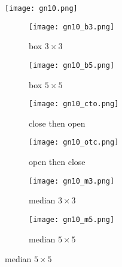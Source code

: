 \documentclass{article}
\begin{document}
\begin{figure}[ht]
    \centering
    \texttt{[image: gn10.png]}
    \caption{gaussian noise 10}
    \label{fig:top_image}

    \begin{subfigure}{0.3\textwidth}
        \texttt{[image: gn10\_b3.png]}
        \caption{box $3 \times 3$}
        \label{fig:sub1}
    \end{subfigure}
    \begin{subfigure}{0.3\textwidth}
        \texttt{[image: gn10\_b5.png]}
        \caption{box $5 \times 5$}
        \label{fig:sub2}
    \end{subfigure}

    \begin{subfigure}{0.3\textwidth}
        \texttt{[image: gn10\_cto.png]}
        \caption{close then open}
        \label{fig:sub3}
    \end{subfigure}%
    \begin{subfigure}{0.3\textwidth}
        \texttt{[image: gn10\_otc.png]}
        \caption{open then close}
        \label{fig:sub4}
    \end{subfigure}

    \begin{subfigure}{0.3\textwidth}
        \texttt{[image: gn10\_m3.png]}
        \caption{median $3 \times 3$}
        \label{fig:sub5}
    \end{subfigure}%
    \begin{subfigure}{0.3\textwidth}
        \texttt{[image: gn10\_m5.png]}
        \caption{median $5 \times 5$}
        \label{fig:sub6}
    \end{subfigure}

\end{figure}
\newpage
\end{document}
